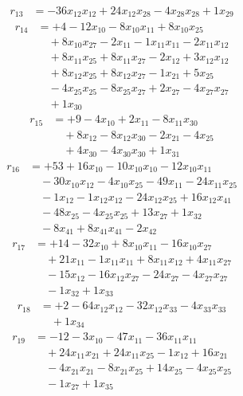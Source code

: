\[\begin{aligned}
r_{13} &= - 36 x_{12} x_{12} + 24 x_{12} x_{28} - 4 x_{28} x_{28} + 1 x_{29}
\end{aligned}\]
\[\begin{aligned}
r_{14} &= + 4 - 12 x_{10} - 8 x_{10} x_{11} + 8 x_{10} x_{25} \\
 &\quad + 8 x_{10} x_{27} - 2 x_{11} - 1 x_{11} x_{11} - 2 x_{11} x_{12} \\
 &\quad + 8 x_{11} x_{25} + 8 x_{11} x_{27} - 2 x_{12} + 3 x_{12} x_{12} \\
 &\quad + 8 x_{12} x_{25} + 8 x_{12} x_{27} - 1 x_{21} + 5 x_{25} \\
 &\quad - 4 x_{25} x_{25} - 8 x_{25} x_{27} + 2 x_{27} - 4 x_{27} x_{27} \\
 &\quad + 1 x_{30}
\end{aligned}\]
\[\begin{aligned}
r_{15} &= + 9 - 4 x_{10} + 2 x_{11} - 8 x_{11} x_{30} \\
 &\quad + 8 x_{12} - 8 x_{12} x_{30} - 2 x_{21} - 4 x_{25} \\
 &\quad + 4 x_{30} - 4 x_{30} x_{30} + 1 x_{31}
\end{aligned}\]
\[\begin{aligned}
r_{16} &= + 53 + 16 x_{10} - 10 x_{10} x_{10} - 12 x_{10} x_{11} \\
 &\quad - 30 x_{10} x_{12} - 4 x_{10} x_{25} - 49 x_{11} - 24 x_{11} x_{25} \\
 &\quad - 1 x_{12} - 1 x_{12} x_{12} - 24 x_{12} x_{25} + 16 x_{12} x_{41} \\
 &\quad - 48 x_{25} - 4 x_{25} x_{25} + 13 x_{27} + 1 x_{32} \\
 &\quad - 8 x_{41} + 8 x_{41} x_{41} - 2 x_{42}
\end{aligned}\]
\[\begin{aligned}
r_{17} &= + 14 - 32 x_{10} + 8 x_{10} x_{11} - 16 x_{10} x_{27} \\
 &\quad + 21 x_{11} - 1 x_{11} x_{11} + 8 x_{11} x_{12} + 4 x_{11} x_{27} \\
 &\quad - 15 x_{12} - 16 x_{12} x_{27} - 24 x_{27} - 4 x_{27} x_{27} \\
 &\quad - 1 x_{32} + 1 x_{33}
\end{aligned}\]
\[\begin{aligned}
r_{18} &= + 2 - 64 x_{12} x_{12} - 32 x_{12} x_{33} - 4 x_{33} x_{33} \\
 &\quad + 1 x_{34}
\end{aligned}\]
\[\begin{aligned}
r_{19} &= - 12 - 3 x_{10} - 47 x_{11} - 36 x_{11} x_{11} \\
 &\quad + 24 x_{11} x_{21} + 24 x_{11} x_{25} - 1 x_{12} + 16 x_{21} \\
 &\quad - 4 x_{21} x_{21} - 8 x_{21} x_{25} + 14 x_{25} - 4 x_{25} x_{25} \\
 &\quad - 1 x_{27} + 1 x_{35}
\end{aligned}\]
